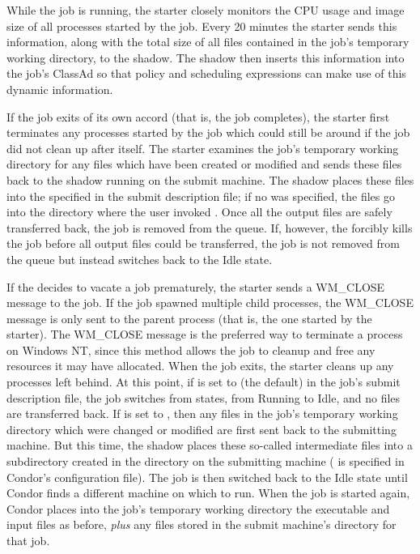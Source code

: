 While the job is running, the starter closely monitors the CPU
usage and image size of all processes started by the job.
Every 20 minutes the starter sends this information,
along with the total size of all files contained in the job's
temporary working directory, to the shadow.
The shadow then
inserts this information into the job's ClassAd so that policy and
scheduling expressions can make use of this dynamic information.

If the job exits of its own accord (that is, the job completes),
the starter
first terminates any processes started by the job which could still be
around if the job did not clean up after itself.
The starter examines the job's temporary working directory for any
files which have been created or modified and sends these files back
to the shadow running on the submit machine.
The shadow
places these files into the  specified in the
submit description file; if no  was specified, the files go
into the directory where the user invoked .
Once all the output files are safely transferred back,
the job is removed from the queue.
If, however, the  forcibly kills the job before all output files
could be transferred, the job is not removed from the queue but instead
switches back to the Idle state.  

If the  decides to vacate a job prematurely,
the starter sends a WM\_CLOSE message to the job.
If the job spawned multiple child processes, the WM\_CLOSE message is only
sent to the parent process (that is, the one started by the starter).
The
WM\_CLOSE message is the preferred way to terminate a process on Windows NT,
since this method allows the job to cleanup and free any resources it may
have allocated.
When the job exits, the starter cleans up any processes left behind.
At this point, if  is set to
 (the default) in the job's submit description file,
the job switches from states, from Running to Idle,
and no files are transferred back.
If  is set to , then any files
in the job's temporary working directory which were changed or modified are
first sent back to the submitting machine.
But this time, the shadow places these
so-called intermediate files into a subdirectory created in the
 directory on the submitting machine
( is specified in Condor's configuration file).
The job is then switched back to the Idle state until Condor finds
a different machine on which to run.
When the job is started again,
Condor places into the job's temporary working directory the executable
and input files as before,
\emph{plus} any files stored in the submit machine's  directory for that job.  

